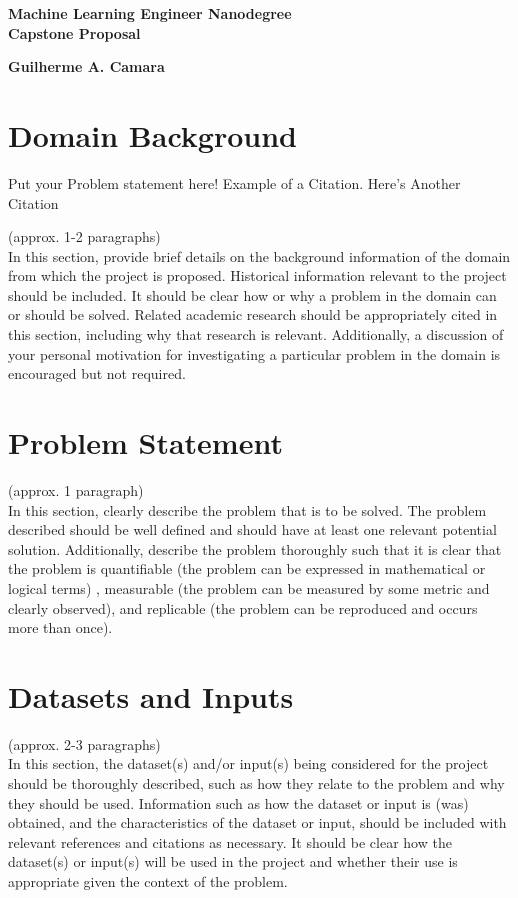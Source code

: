 \documentclass[a4paper, 11pt]{article}
\begin{document}
\noindent
\begin{center}
\large\textbf{Machine Learning Engineer Nanodegree}\\ 
\large\textbf{Capstone Proposal}\\ 
\end{center}


\hfill \textbf{Guilherme A. Camara}


\section*{Domain Background}
Put your Problem statement here! Example of a Citation\cite[p.219]{Robotics}. Here's Another Citation\cite{Flueck}

(approx. 1-2 paragraphs) \\
In this section, provide brief details on the background information of the domain from which the project is proposed. 
Historical information relevant to the project should be included. 
It should be clear how or why a problem in the domain can or should be solved. 
Related academic research should be appropriately cited in this section, including why that research is relevant. 
Additionally, a discussion of your personal motivation for investigating a particular problem in the domain is encouraged but not required.


\section*{Problem Statement}
(approx. 1 paragraph) \\
In this section, clearly describe the problem that is to be solved. 
The problem described should be well defined and should have at least one relevant potential solution. 
Additionally, describe the problem thoroughly such that it is clear that the problem is quantifiable (the problem can be expressed in mathematical or logical terms) , measurable (the problem can be measured by some metric and clearly observed), and replicable (the problem can be reproduced and occurs more than once).

\section*{Datasets and Inputs}
(approx. 2-3 paragraphs) \\
In this section, the dataset(s) and/or input(s) being considered for the project should be thoroughly described, such as how they relate to the problem and why they should be used. 
Information such as how the dataset or input is (was) obtained, and the characteristics of the dataset or input, should be included with relevant references and citations as necessary. 
It should be clear how the dataset(s) or input(s) will be used in the project and whether their use is appropriate given the context of the problem.
\end{document}
